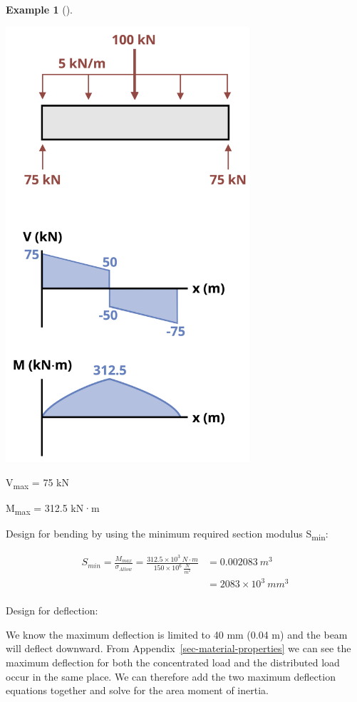 \documentclass[
  letterpaper,
  DIV=11,
  numbers=noendperiod]{scrreprt}
\theoremstyle{definition}
\newtheorem{example}{Example}[chapter]
\theoremstyle{remark}
\begin{document}
\begin{tcolorbox}
\begin{example}[]
\begin{tcolorbox}
\begin{center}
\includegraphics[width=3.5625in,height=\textheight]{images/CH11 PNGs/example11.9-2.png}
\end{center}

V\textsubscript{max} = 75 kN

M\textsubscript{max} = 312.5 kN·m

Design for bending by using the minimum required section modulus
S\textsubscript{min}:

\[
\begin{aligned}
S_{min}=\frac{M_{max}}{\sigma_{Allow}}=\frac{312.5\times10^3{~N}\cdot{m}}{150 \times 10^6~\frac{N}{m^2}} & =0.002083{~m}^3 \\ 
& =2083 \times 10^3{~mm}^3 \\
\end{aligned}
\]

Design for deflection:

We know the maximum deflection is limited to 40 mm (0.04 m) and the beam
will deflect downward. From Appendix~\ref{sec-material-properties} we
can see the maximum deflection for both the concentrated load and the
distributed load occur in the same place. We can therefore add the two
maximum deflection equations together and solve for the area moment of
inertia.


\end{tcolorbox}
\end{example}
\end{tcolorbox}
\end{document}
